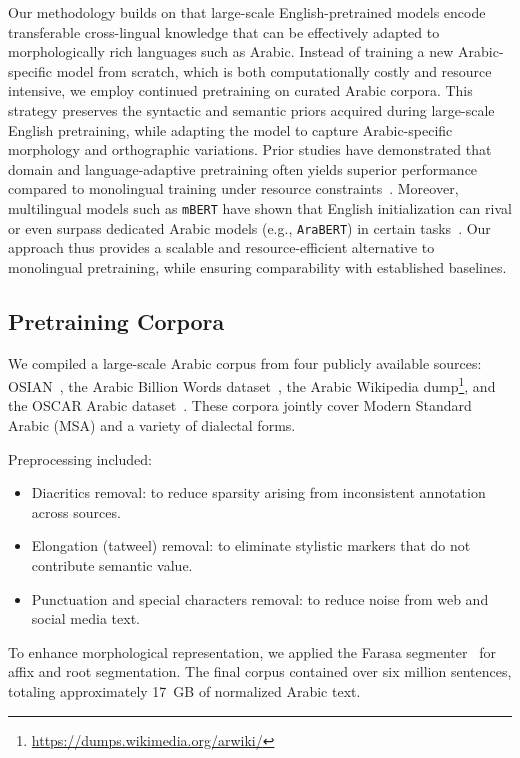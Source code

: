 \documentclass[10pt, a4paper]{article}
\begin{document}
Our methodology builds on that large-scale English-pretrained models encode transferable cross-lingual knowledge that can be effectively adapted to morphologically rich languages such as Arabic. Instead of training a new Arabic-specific model from scratch, which is both computationally costly and resource intensive, we employ continued pretraining on curated Arabic corpora. This strategy preserves the syntactic and semantic priors acquired during large-scale English pretraining, while adapting the model to capture Arabic-specific morphology and orthographic variations. Prior studies have demonstrated that domain and language-adaptive pretraining often yields superior performance compared to monolingual training under resource constraints~\cite{gururangan-etal-2020-dont,pfeiffer-etal-2021-adapterfusion}. Moreover, multilingual models such as \texttt{mBERT} have shown that English initialization can rival or even surpass dedicated Arabic models (e.g., \texttt{AraBERT}) in certain tasks~\cite{alammary2022bert}. Our approach thus provides a scalable and resource-efficient alternative to monolingual pretraining, while ensuring comparability with established baselines.


\subsection{Pretraining Corpora}
We compiled a large-scale Arabic corpus from four publicly available sources: OSIAN~\cite{zeroual-etal-2019-osian}, the Arabic Billion Words dataset~\cite{el20161}, the Arabic Wikipedia dump\footnote{\href{https://dumps.wikimedia.org/arwiki/}{https://dumps.wikimedia.org/arwiki/}}, and the OSCAR Arabic dataset~\cite{2022arXiv220106642A}. These corpora jointly cover Modern Standard Arabic (MSA) and a variety of dialectal forms.  

Preprocessing included:  
\begin{itemize}
    \item Diacritics removal: to reduce sparsity arising from inconsistent annotation across sources.  
    \item Elongation (tatweel) removal: to eliminate stylistic markers that do not contribute semantic value.  
    \item Punctuation and special characters removal: to reduce noise from web and social media text.  
\end{itemize}  

To enhance morphological representation, we applied the Farasa segmenter~\cite{abdelali2016farasa} for affix and root segmentation. The final corpus contained over six million sentences, totaling approximately 17~GB of normalized Arabic text.
\end{document}

